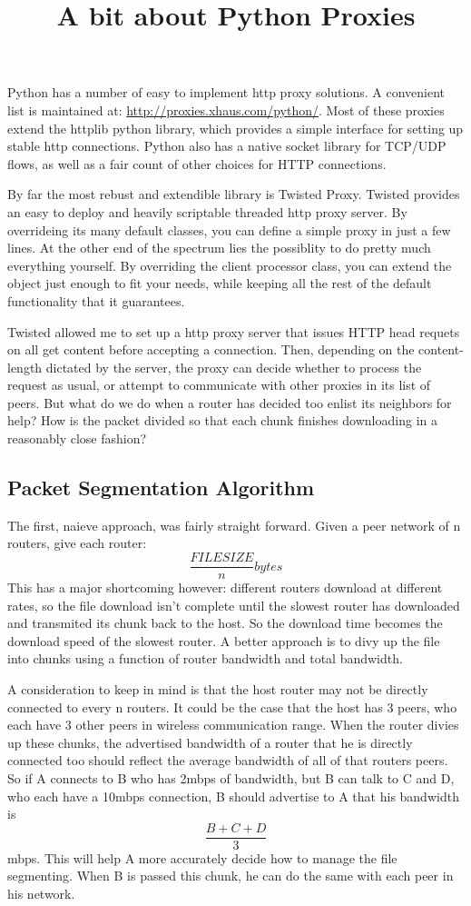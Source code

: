 \documentclass{article}
\title{A bit about Python Proxies}
\begin{document}
Python has a number of easy to implement http proxy solutions. A convenient list is maintained at: \url{http://proxies.xhaus.com/python/}. Most of these proxies extend the httplib python library, which provides a simple interface for setting up stable http connections. Python also has a native socket library for TCP/UDP flows, as well as a fair count of other choices for HTTP connections.

By far the most rebust and extendible library is Twisted Proxy. Twisted provides an easy to deploy and heavily scriptable threaded http proxy server. By overrideing its many default classes, you can define a simple proxy in just a few lines. At the other end of the spectrum lies the possiblity to do pretty much everything yourself. By overriding the client processor class, you can extend the object just enough to fit your needs, while keeping all the rest of the default functionality that it guarantees. 

Twisted allowed me to set up a http proxy server that issues HTTP head requets on all get content before accepting a connection. Then, depending on the content-length dictated by the server, the proxy can decide whether to process the request as usual, or attempt to communicate with other proxies in its list of peers. But what do we do when a router has decided too enlist its neighbors for help? How is the packet divided so that each chunk finishes downloading in a reasonably close fashion?

\subsection{Packet Segmentation Algorithm}

The first, naieve approach, was fairly straight forward. Given a peer network of n routers, give each router: $$\frac{FILESIZE}{n} bytes$$ This has a major shortcoming however: different routers download at different rates, so the file download isn't complete until the slowest router has downloaded and transmited its chunk back to the host. So the download time becomes the download speed of the slowest router. A better approach is to divy up the file into chunks using a function of router bandwidth and total bandwidth. 

A consideration to keep in mind is that the host router may not be directly connected to every n routers. It could be the case that the host has 3 peers, who each have 3 other peers in wireless communication range. When the router divies up these chunks, the advertised bandwidth of a router that he is directly connected too should reflect the average bandwidth of all of that routers peers. So if A connects to B who has 2mbps of bandwidth, but B can talk to C and D, who each have a 10mbps connection, B should advertise to A that his bandwidth is $$\frac{B + C + D}{3}$$ mbps. This will help A more accurately decide how to manage the file segmenting. When B is passed this chunk, he can do the same with each peer in his network.
\end{document}
